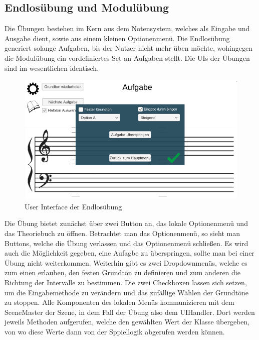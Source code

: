 \subsection*{Endlosübung und Modulübung}
Die Übungen bestehen im Kern aus dem Notensystem, welches als Eingabe und Ausgabe dient, sowie aus einem kleinen Optionenmenü. Die Endlosübung generiert solange Aufgaben, bis der Nutzer nicht mehr üben möchte, wohingegen die Modulübung ein vordefiniertes Set an Aufgaben stellt. Die UIs der Übungen sind im wesentlichen identisch. 
\begin{figure}[H]
    \centering
    \includegraphics[width=1\textwidth]{Bilder/endlosspiel.png}
    \caption{User Interface der Endlosübung}
    \label{sec:hps_algo}
\end{figure}
Die Übung bietet zunächst über zwei Button an, das lokale Optionenmenü und das Theoriebuch zu öffnen. Betrachtet man das Optionenmenü, so sieht man Buttons, welche die Übung verlassen und das Optionenmenü schließen. Es wird auch die Möglichkeit gegeben, eine Aufagbe zu überspringen, sollte man bei einer Übung nicht weiterkommen. Weiterhin gibt es zwei Dropdownmenüs, welche es zum einen erlauben, den festen Grundton zu definieren und zum anderen die Richtung der Intervalle zu bestimmen. Die zwei Checkboxen lassen sich setzen, um die Eingabemethode zu verändern und das zufällige Wählen der Grundtöne zu stoppen. Alle Komponenten des lokalen Menüs kommunizieren mit dem SceneMaster der Szene, in dem Fall der Übung also dem UIHandler. Dort werden jeweils Methoden aufgerufen, welche den gewählten Wert der Klasse übergeben, von wo diese Werte dann von der Sppiellogik abgerufen werden können. \\
